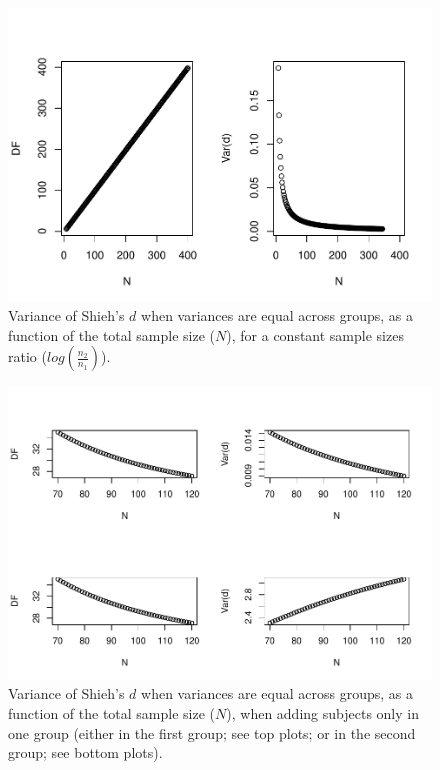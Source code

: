 \documentclass[
  english,
  man,mask]{apa6}
\begin{document}
\begin{figure}
\centering
\includegraphics{SupMat1_files/figure-latex/varshiehhomNsize2-1.pdf}
\caption{\label{fig:varshiehhomNsize2}Variance of Shieh's \(d\) when variances are equal across groups, as a function of the total sample size (\(N\)), for a constant sample sizes ratio (\(log\left(\frac{n_2}{n_1} \right)\)).}
\end{figure}

\begin{figure}
\centering
\includegraphics{SupMat1_files/figure-latex/varshiehhomNsize4-1.pdf}
\caption{\label{fig:varshiehhomNsize4}Variance of Shieh's \(d\) when variances are equal across groups, as a function of the total sample size (\(N\)), when adding subjects only in one group (either in the first group; see top plots; or in the second group; see bottom plots).}
\end{figure}
\end{document}
